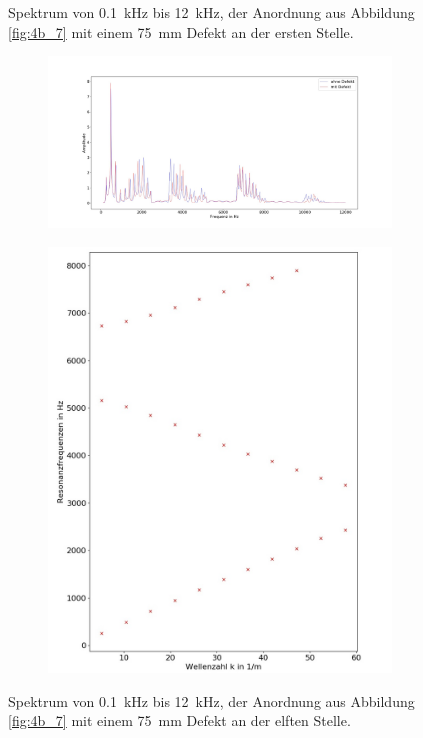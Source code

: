 \begin{figure}
\begin{subfigure}{0.34\textwidth}
\end{subfigure}
\caption{Spektrum von 0.1~kHz bis 12~kHz, der Anordnung aus Abbildung \ref{fig:4b_7} mit einem 75~mm Defekt an der ersten Stelle.}
\label{fig:4b_7_1a}
\end{figure}
\begin{figure}
\centering
\begin{subfigure}{0.65\textwidth}
\includegraphics[width=\textwidth]{content/Scripts/defect2.jpg}
\end{subfigure}
\begin{subfigure}{0.34\textwidth}
\includegraphics[width=\textwidth]{content/Scripts/4b_7_1b.jpg}
\end{subfigure}
\caption{Spektrum von 0.1~kHz bis 12~kHz, der Anordnung aus Abbildung \ref{fig:4b_7} mit einem 75~mm Defekt an der elften Stelle.}
\label{fig:4b_7_1b}
\end{figure}
